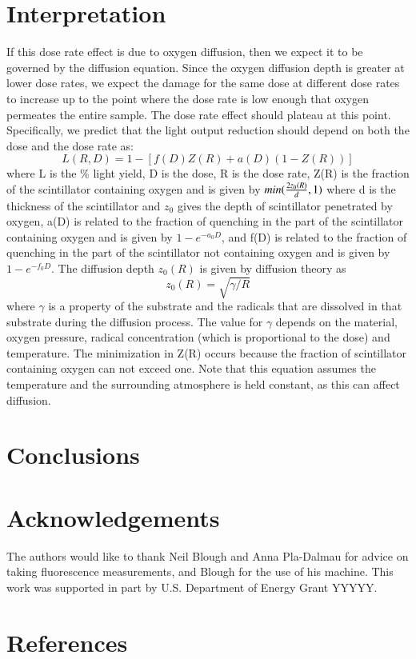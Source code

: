 \documentclass[review]{elsarticle}
\begin{document}
\section{Interpretation}


If this dose rate effect is due to oxygen diffusion, then
we expect it to be governed by the diffusion equation.  Since
the oxygen diffusion depth is greater at lower dose rates,
we expect the damage for the same dose at different dose rates to
increase up to the point where the dose rate is low enough that oxygen
permeates the entire sample.  The dose rate effect should plateau
at this point.  Specifically, we predict that the light output
reduction should depend on both the dose and the dose rate as:
$$ L(R,D) = 1 - [f(D)Z(R) + a(D)(1-Z(R))]$$
where L is the \% light yield, D is the dose, R is the dose rate, 
Z(R) is the fraction of the scintillator containing 
oxygen and is given by $min({{2 z_0(R)}\over{d}},1)$
where d is the thickness of the scintillator and $z_0$ gives
the depth of scintillator penetrated by oxygen,
a(D) is related to the fraction of quenching in the part of
the scintillator containing oxygen and is given by $1-e^{-a_0 D}$, 
and
f(D) is related to the fraction of quenching in the part of
the scintillator not containing oxygen and is given by $1-e^{-f_0 D}$.
The diffusion depth $z_0(R)$ is given by diffusion theory as 
$$z_0(R)=\sqrt{\gamma/R}$$
where $\gamma$ is a property of the substrate and the radicals that
are dissolved in that substrate during the diffusion process.
The value for $\gamma$ depends on the material, oxygen pressure,
radical concentration (which is proportional to the dose) and 
temperature.
The minimization in Z(R) occurs because the fraction of scintillator
containing oxygen can not exceed one.  Note that this equation 
assumes the temperature and the surrounding atmosphere
is held constant, as this can 
affect diffusion.


\section{Conclusions}

\section{Acknowledgements}
The authors would like to thank Neil Blough and Anna Pla-Dalmau for advice on taking fluorescence measurements, and Blough for the use of his machine.  This work was supported in part by U.S. Department of Energy Grant YYYYY.

\section*{References}


\end{document}
